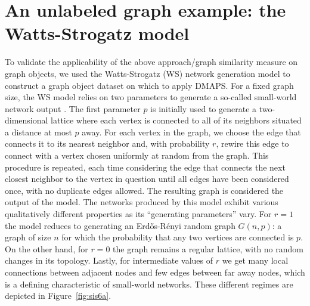 \section{An unlabeled graph example: the Watts-Strogatz model}

To validate the applicability of the above approach/graph similarity
measure on graph objects, we used the Watts-Strogatz (WS) network
generation model to construct a graph object dataset on which to apply
DMAPS. For a fixed graph size, the WS model relies on two parameters
to generate a so-called small-world network output
\cite{watts_collective_1998}. The first parameter $p$ is initially
used to generate a two-dimensional lattice where each vertex is
connected to all of its neighbors situated a distance at most $p$
away. For each vertex in the graph, we choose the edge that connects
it to its nearest neighbor and, with probability $r$, rewire this edge
to connect with a vertex chosen uniformly at random from the
graph. This procedure is repeated, each time considering the edge that
connects the next closest neighbor to the vertex in question until all
edges have been considered once, with no duplicate edges allowed. The
resulting graph is considered the output of the model. The networks
produced by this model exhibit various qualitatively different
properties as its “generating parameters” vary. For $r=1$ the model
reduces to generating an Erd\H{o}s-R\'{e}nyi random graph $G(n,p)$: a graph of
size $n$ for which the probability that any two vertices are connected
is $p$. On the other hand, for $r=0$ the graph remains a regular
lattice, with no random changes in its topology. Lastly, for
intermediate values of $r$ we get many local connections between
adjacent nodes and few edges between far away nodes, which is a
defining characteristic of small-world networks. These different
regimes are depicted in Figure~\ref{fig:sis6a}.

